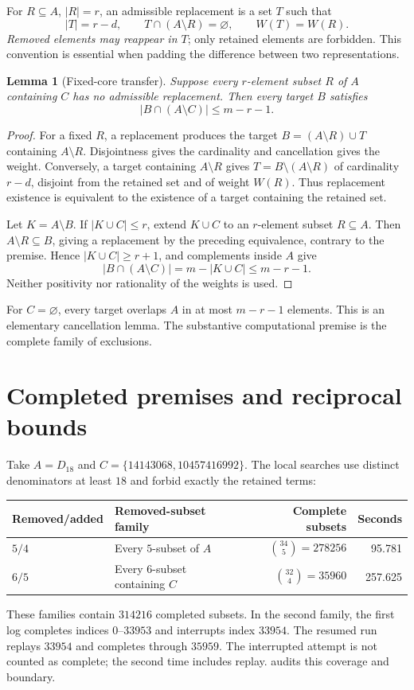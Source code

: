 \documentclass[10pt,a4paper]{article}
\newtheorem{lemma}[proposition]{Lemma}
\newcommand{\card}[1]{\lvert #1\rvert}
\newcommand{\code}[1]{\texttt{\detokenize{#1}}}
\begin{document}
For $R\subseteq A$, $\card R=r$, an admissible replacement is a set $T$ such that
\[
 \card T=r-d,\qquad T\cap(A\setminus R)=\varnothing,
 \qquad W(T)=W(R).
\]
\emph{Removed elements may reappear in $T$}; only retained elements are
forbidden. This convention is essential when padding the difference between
two representations.

\begin{lemma}[Fixed-core transfer]\label{lem:transfer}
Suppose every $r$-element subset $R$ of $A$ containing $C$ has no admissible
replacement. Then every target $B$ satisfies
\[
 \card{B\cap(A\setminus C)}\leq m-r-1.
\]
\end{lemma}
\begin{proof}
For a fixed $R$, a replacement produces the target
$B=(A\setminus R)\cup T$ containing $A\setminus R$. Disjointness gives the
cardinality and cancellation gives the weight. Conversely, a target containing
$A\setminus R$ gives $T=B\setminus(A\setminus R)$ of cardinality $r-d$,
disjoint from the retained set and of weight $W(R)$. Thus replacement existence
is equivalent to the existence of a target containing the retained set.

Let $K=A\setminus B$. If $\card{K\cup C}\leq r$, extend $K\cup C$ to an
$r$-element subset $R\subseteq A$. Then $A\setminus R\subseteq B$, giving a
replacement by the preceding equivalence, contrary to the premise. Hence
$\card{K\cup C}\geq r+1$, and complements inside $A$ give
\[
 \card{B\cap(A\setminus C)}=m-\card{K\cup C}\leq m-r-1.
\]
Neither positivity nor rationality of the weights is used.
\end{proof}
For $C=\varnothing$, every target overlaps $A$ in at most $m-r-1$ elements.
This is an elementary cancellation lemma. The substantive computational premise
is the complete family of exclusions.

\section{Completed premises and reciprocal bounds}
Take $A=D_{18}$ and $C=\{14143068,10457416992\}$. The local searches use
distinct denominators at least $18$ and forbid exactly the retained terms:
\begin{center}\small
\begin{tabular}{llrr}
\toprule
Removed/added & Removed-subset family & Complete subsets & Seconds\\
\midrule
$5/4$ & Every $5$-subset of $A$ & $\binom{34}{5}=278256$ &95.781\\
$6/5$ & Every $6$-subset containing $C$ & $\binom{32}{4}=35960$ &257.625\\
\bottomrule
\end{tabular}
\end{center}
These families contain $314216$ completed subsets. In the second family, the
first log completes indices $0$--$33953$ and interrupts index $33954$. The resumed
run replays $33954$ and completes through $35959$. The interrupted attempt is not
counted as complete; the second time includes replay.
\code{search-records/verify_local_premises.py} audits this coverage and boundary.
\end{document}
